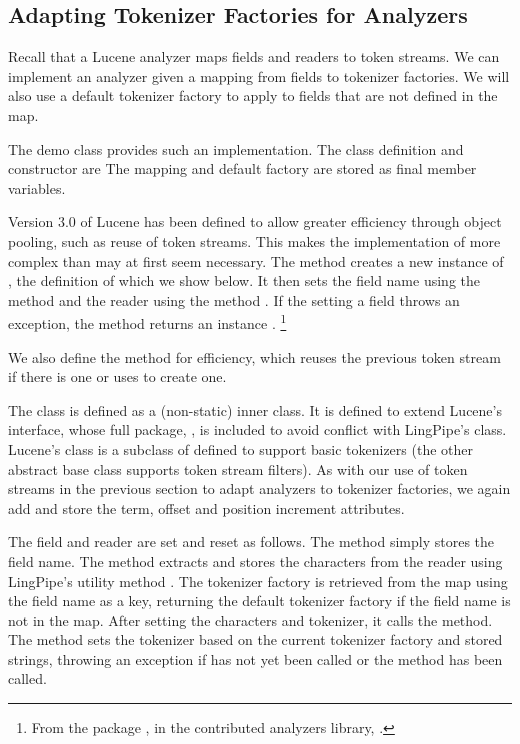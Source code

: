 \subsection{Adapting Tokenizer Factories for Analyzers}

Recall that a Lucene analyzer maps fields and readers to token
streams.  We can implement an analyzer given a mapping from fields to
tokenizer factories.  We will also use a default tokenizer factory to
apply to fields that are not defined in the map.

The demo class  provides such
an implementation.  The class definition and constructor are
%
%
The mapping and default factory are stored as final member variables.

Version 3.0 of Lucene has been defined to allow greater efficiency
through object pooling, such as reuse of token streams.  This makes
the implementation of  more complex than may at
first seem necessary.  
%
%
The method creates a new instance of , the
definition of which we show below.  It then sets the field name using
the method  and the reader using the method
.  If the setting a field throws an exception, the
 method returns an instance
.%
%
\footnote{From the package
  , in the contributed
  analyzers library, .}
%

We also define the  method for efficiency,
which reuses the previous token stream if there is one or uses
 to create one.  

The class  is defined as a (non-static)
inner class.  
%
%
It is defined to extend Lucene's  interface, whose
full package, , is included to avoid
conflict with LingPipe's  class.  Lucene's
 class is a subclass of  defined to
support basic tokenizers (the other abstract base class supports token
stream filters).  As with our use of token streams in the previous
section to adapt analyzers to tokenizer factories, we again add and
store the term, offset and position increment attributes.

The field and reader are set and reset as follows.
%
%
The  method simply stores the field name.  The
 method extracts and stores the characters from
the reader using LingPipe's utility method .
The tokenizer factory is retrieved from the map using the field
name as a key, returning the default tokenizer factory if the
field name is not in the map.  After setting the characters and
tokenizer, it calls the  method.  The 
method sets the tokenizer based on the current tokenizer factory
and stored strings, throwing an exception if 
has not yet been called or the  method has been
called.

